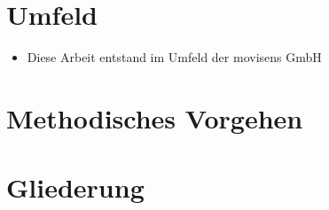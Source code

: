 \section{Umfeld}

\begin{itemize}
\item Diese Arbeit entstand im Umfeld der movisens GmbH
\end{itemize}

\section{Methodisches Vorgehen}

\section{Gliederung}

